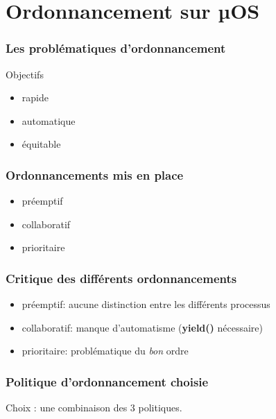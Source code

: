 \documentclass{beamer}
\begin{document}
\section{Ordonnancement sur µOS}

\begin{frame}
    \frametitle{Les problématiques d'ordonnancement}
    \begin{center}
        \huge Objectifs
    \end{center}
    \begin{itemize}
        \item<2-> rapide
        \item<3-> automatique
        \item<4-> équitable
    \end{itemize}
\end{frame}

\begin{frame}
    \frametitle{Ordonnancements mis en place}
    \begin{itemize}
        \item<2-> préemptif
        \item<3-> collaboratif
        \item<4-> prioritaire
    \end{itemize}
\end{frame}

\begin{frame}
    \frametitle{Critique des différents ordonnancements}
    \begin{itemize}
        \item préemptif: aucune distinction entre les différents processus
        \item collaboratif: manque d'automatisme (\textbf{yield()} nécessaire)
        \item prioritaire: problématique du \emph{bon} ordre
    \end{itemize}
\end{frame}

\begin{frame}
    \frametitle{Politique d'ordonnancement choisie}
    \begin{center}
        \huge Choix : une combinaison des 3 politiques.
    \end{center}
\end{frame}
\end{document}
